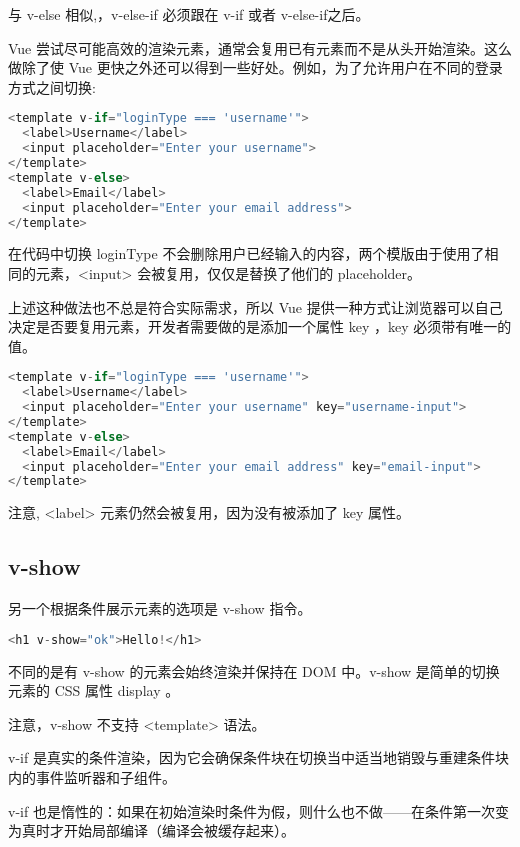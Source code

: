 与 v-else 相似,，v-else-if 必须跟在 v-if 或者 v-else-if之后。


Vue 尝试尽可能高效的渲染元素，通常会复用已有元素而不是从头开始渲染。这么做除了使 Vue 更快之外还可以得到一些好处。例如，为了允许用户在不同的登录方式之间切换:



\begin{lstlisting}[language=JavaScript]
<template v-if="loginType === 'username'">
  <label>Username</label>
  <input placeholder="Enter your username">
</template>
<template v-else>
  <label>Email</label>
  <input placeholder="Enter your email address">
</template>
\end{lstlisting}

在代码中切换 loginType 不会删除用户已经输入的内容，两个模版由于使用了相同的元素，<input> 会被复用，仅仅是替换了他们的 placeholder。

上述这种做法也不总是符合实际需求，所以 Vue 提供一种方式让浏览器可以自己决定是否要复用元素，开发者需要做的是添加一个属性 key ，key 必须带有唯一的值。

\begin{lstlisting}[language=JavaScript]
<template v-if="loginType === 'username'">
  <label>Username</label>
  <input placeholder="Enter your username" key="username-input">
</template>
<template v-else>
  <label>Email</label>
  <input placeholder="Enter your email address" key="email-input">
</template>
\end{lstlisting}

注意, <label> 元素仍然会被复用，因为没有被添加了 key 属性。


\subsection{v-show}

另一个根据条件展示元素的选项是 v-show 指令。


\begin{lstlisting}[language=JavaScript]
<h1 v-show="ok">Hello!</h1>
\end{lstlisting}

不同的是有 v-show 的元素会始终渲染并保持在 DOM 中。v-show 是简单的切换元素的 CSS 属性 display 。


注意，v-show 不支持 <template> 语法。

\begin{compactitem}
\item v-if 是真实的条件渲染，因为它会确保条件块在切换当中适当地销毁与重建条件块内的事件监听器和子组件。
\item v-if 也是惰性的：如果在初始渲染时条件为假，则什么也不做——在条件第一次变为真时才开始局部编译（编译会被缓存起来）。
\end{compactitem}


